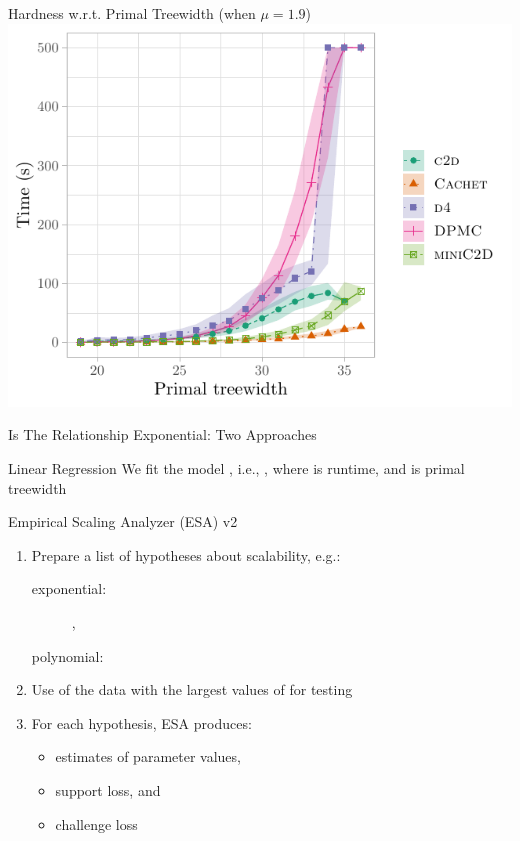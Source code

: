 \documentclass{beamer}
\begin{document}
\begin{frame}{Hardness w.r.t. Primal Treewidth (when $\mu = 1.9$)}
  \centering
  \includegraphics{treewidth2.pdf}
\end{frame}

\begin{frame}{Is The Relationship Exponential: Two Approaches}
  \begin{block}{Linear Regression}
    We fit the model , i.e.,
    , where  is
    \alert{runtime}, and  is \alert{primal treewidth}
    \end{block}
  \begin{block}{Empirical Scaling Analyzer (ESA) v2~\parencite{DBLP:conf/gecco/PushakH20}}
    \begin{enumerate}
      \item Prepare a list of hypotheses about scalability, e.g.:
      \begin{description}
        \item[exponential:] ,
        \item[polynomial:] 
      \end{description}
      \item Use  of the data with the largest
            values of  for testing
      \item For each hypothesis, ESA produces:
      \begin{itemize}
        \item estimates of parameter values,
        \item support loss, and
        \item challenge loss
      \end{itemize}
    \end{enumerate}
  \end{block}
\end{frame}
\end{document}
